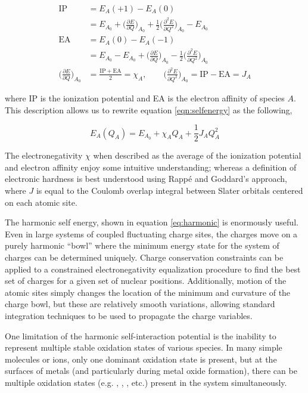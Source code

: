 \begin{align*}
\mathrm{IP} &= E_A(+1) - E_A(0) \\
& = E_{A_0} + \bigg (\frac{\partial E}{\partial Q}\bigg)_{A_0} + \frac{1}{2}\bigg(\frac{\partial^2E}{\partial Q^2}\bigg)_{A_0} - E_{A_0} \\
\mathrm{EA} &= E_A(0) - E_A(-1) \\
& = E_{A_0} - E_{A_0} + \bigg (\frac{\partial E}{\partial Q}\bigg)_{A_0} - \frac{1}{2}\bigg(\frac{\partial^2E}{\partial Q^2}\bigg)_{A_0}  \\
\bigg (\frac{\partial E}{\partial Q}\bigg)_{A_0} &= \frac{\mathrm{IP+EA}}{2} = \chi_A ,\qquad \bigg (\frac{\partial^2 E}{\partial Q^2}\bigg)_{A_0} = \mathrm{IP-EA} = J_A
\end{align*}

where IP is the ionization potential and EA is the electron affinity of species
$A$.  This description allows us to rewrite equation \ref{eqn:selfenergy} as
the following,

\begin{equation}
E_A(Q_A) = E_{A_0} + \chi_A Q_A + \frac{1}{2} J_{A} Q_A^2
\label{eq:harmonic}
\end{equation}

The electronegativity $\chi$ when described as the average of the ionization
potential and electron affinity enjoy some intuitive understanding; whereas a
definition of electronic hardness is best understood using Rapp\'e and
Goddard's approach, where $J$ is equal to the Coulomb overlap integral between
Slater orbitals centered on each atomic site\citep{Rappe:1991dq}.

The harmonic self energy, shown in equation \ref{eq:harmonic} is enormously useful.
Even in large systems of coupled fluctuating charge sites, the charges move on
a purely harmonic ``bowl'' where the minimum energy state for the system of
charges can be determined uniquely. Charge conservation constraints can be
applied to a constrained electronegativity equalization procedure to find the
best set of charges for a given set of nuclear positions.  Additionally, motion
of the atomic sites simply changes the location of the minimum and curvature of
the charge bowl, but these are relatively smooth variations, allowing standard
integration techniques to be used to propagate the charge variables.

One limitation of the harmonic self-interaction potential is the inability to
represent multiple stable oxidation states of various species. In many simple
molecules or ions, only one dominant oxidation state is present, but at the
surfaces of metals (and particularly during metal oxide formation), there can
be multiple oxidation states (e.g. , , , etc.)
present in the system simultaneously.

